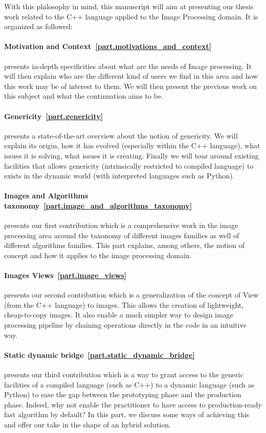 With this philosophy in mind, this manuscript will aim at presenting our thesis work related to the C++ language applied
to the Image Processing domain. It is organized as followed:

\paragraph{Motivation and Context~\ref{part.motivations_and_context}} presents in-depth specificities about what are the
needs of Image processing. It will then explain who are the different kind of users we find in this area and how this
work may be of interest to them. We will then present the previous work on this subject and what the continuation aims
to be.

\paragraph{Genericity~\ref{part.genericity}} presents a state-of-the-art overview about the notion of genericity. We
will explain its origin, how it has evolved (especially within the C++ language), what issues it is solving, what issues
it is creating. Finally we will tour around existing facilities that allows genericity (intrinsically restricted to
compiled language) to exists in the dynamic world (with interpreted languages such as Python).

\paragraph{Images and Algorithms taxonomy~\ref{part.image_and_algorithms_taxonomy}} presents our first contribution
which is a comprehensive work in the image processing area around the taxonomy of different images families as well of
different algorithms families. This part explains, among others, the notion of concept and how it applies to the
image processing domain.

\paragraph{Images Views~\ref{part.image_views}} presents our second contribution which is a generalization of the
concept of View (from the C++ language) to images. This allows the creation of lightweight, cheap-to-copy images. It
also enable a much simpler way to design image processing pipeline by chaining operations directly in the code in an
intuitive way.

\paragraph{Static dynamic bridge~\ref{part.static_dynamic_bridge}} presents our third contribution which is a way to
grant access to the generic facilities of a compiled language (such as C++) to a dynamic language (such as Python) to
ease the gap between the prototyping phase and the production phase. Indeed, why not enable the practitioner to have
access to production-ready fast algorithm by default? In this part, we discuss some ways of achieving this and offer our
take in the shape of an hybrid solution.

